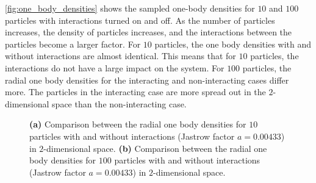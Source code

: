 \autoref{fig:one_body_densities} shows the sampled one-body densities for $10$ and $100$ particles with interactions turned on and off. As the number of particles increases, the density of particles increases, and the interactions between the particles become a larger factor. For $10$ particles, the one body densities with and without interactions are almost identical. This means that for $10$ particles, the interactions do not have a large impact on the system. For $100$ particles, the radial one body densities for the interacting and non-interacting cases differ more. The particles in the interacting case are more spread out in the $2$-dimensional space than the non-interacting case. 
\begin{figure}[H]
\centering
{} 
\qquad
{}
\caption{\textbf{(a)} Comparison between the radial one body densities for $10$ particles with and without interactions (Jastrow factor $a=0.00433$) in $2$-dimensional space. \textbf{(b)} Comparison between the radial one body densities for $100$ particles with and without interactions (Jastrow factor $a=0.00433$) in $2$-dimensional space.}
\label{fig:one_body_densities}
\end{figure}



